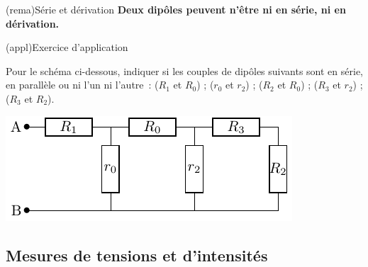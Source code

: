 \documentclass[../../main/main.tex]{subfiles}
\begin{document}
\begin{tcb}[label=rema:serdiv, halign=center](rema){Série et dérivation}
	\textbf{Deux dipôles peuvent n'être ni en série, ni en dérivation.}
\end{tcb}
\begin{tcb}[label=exer:serdiv](appl){Exercice d'application}

	\begin{minipage}{0.65\linewidth}

		Pour le schéma ci-dessous, indiquer si les couples de dipôles suivants
		sont en série, en parallèle ou ni l'un ni l'autre~: ($R_1$ et $R_0$) ;
		($r_0$ et $r_2$) ; ($R_2$ et $R_0$) ; ($R_3$ et $r_2$) ; ($R_3$ et
		$R_2$).

	\end{minipage}
	\begin{minipage}{0.35\linewidth}
		\begin{center}
			\includegraphics[width=\linewidth]{exer_serdiv}
		\end{center}
	\end{minipage}
	\tcblower
	\vspace*{2cm}
\end{tcb}

\subsection{Mesures de tensions et d'intensités}
\end{document}
